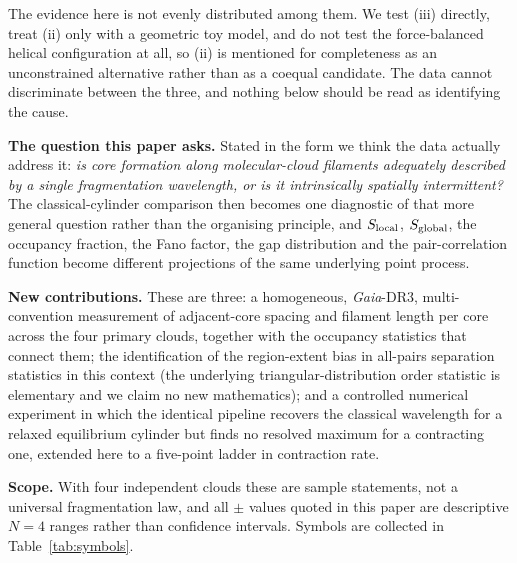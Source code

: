 \documentclass[usenatbib,twoside,twocolumn]{mnras}
\begin{document}
The evidence here is not evenly distributed among them. We test (iii) directly, treat (ii) only with a geometric toy model, and do not test the force-balanced helical configuration at all, so (ii) is mentioned for completeness as an unconstrained alternative rather than as a coequal candidate. The data cannot discriminate between the three, and nothing below should be read as identifying the cause.

\smallskip\noindent\textbf{The question this paper asks.} Stated in the form we think the data actually address it: \emph{is core formation along molecular-cloud filaments adequately described by a single fragmentation wavelength, or is it intrinsically spatially intermittent?} The classical-cylinder comparison then becomes one diagnostic of that more general question rather than the organising principle, and $S_{\rm local}$, $S_{\rm global}$, the occupancy fraction, the Fano factor, the gap distribution and the pair-correlation function become different projections of the same underlying point process.

\smallskip\noindent\textbf{New contributions.} These are three: a homogeneous, \textit{Gaia}-DR3, multi-convention measurement of adjacent-core spacing and filament length per core across the four primary clouds, together with the occupancy statistics that connect them; the identification of the region-extent bias in all-pairs separation statistics in this context (the underlying triangular-distribution order statistic is elementary and we claim no new mathematics); and a controlled numerical experiment in which the identical pipeline recovers the classical wavelength for a relaxed equilibrium cylinder but finds no resolved maximum for a contracting one, extended here to a five-point ladder in contraction rate.

\smallskip\noindent\textbf{Scope.} With four independent clouds these are sample statements, not a universal fragmentation law, and all $\pm$ values quoted in this paper are descriptive $N=4$ ranges rather than confidence intervals. Symbols are collected in Table~\ref{tab:symbols}.
\end{document}
